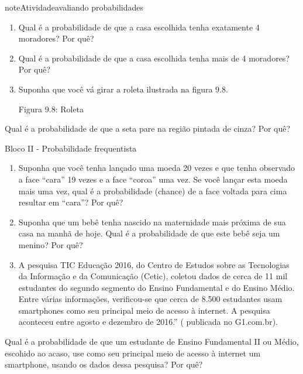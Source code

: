 \begin{sphinxadmonition}{note}{Atividade}{avaliando probabilidades}
\begin{enumerate}
\item {} 
Qual é a probabilidade de que a casa escolhida tenha exatamente 4 moradores? Por quê?

\item {} 
Qual é a probabilidade de que a casa escolhida tenha mais de 4 moradores? Por quê?

\item {} 
Suponha que você vá girar a roleta ilustrada na figura 9.8.

\begin{figure}[H]
\centering

\noindent{}
\end{figure}

Figura 9.8: Roleta

\end{enumerate}

Qual é a probabilidade de que a seta pare na região pintada de cinza? Por quê?

Bloco II - Probabilidade frequentista
\begin{enumerate}
\item {} 
Suponha que você tenha lançado uma moeda 20 vezes e que tenha observado a face “cara” 19 vezes e a face “coroa” uma vez. Se você lançar esta moeda mais uma vez, qual é a probabilidade (chance) de a face voltada para cima resultar em “cara”? Por quê?

\item {} 
Suponha que um bebê tenha nascido na maternidade mais próxima de sua casa na manhã de hoje. Qual é a probabilidade de que este bebê seja um menino? Por quê?

\item {} 
A pesquisa TIC Educação 2016, do Centro de Estudos sobre as Tecnologias da Informação e da Comunicação (Cetic), coletou dados de cerca de 11 mil estudantes do segundo segmento do Ensino Fundamental e do Ensino Médio. Entre várias informações, verificou-se que cerca de 8.500 estudantes usam smartphones como seu principal meio de acesso à internet. A pesquisa aconteceu entre agosto e dezembro de 2016.” ( publicada no G1.com.br).

\end{enumerate}

Qual é a probabilidade de que um estudante de Ensino Fundamental II ou Médio, escohido ao acaso, use como seu principal meio de acesso à internet um smartphone, usando os dados dessa pesquisa? Por quê?


\end{sphinxadmonition}
